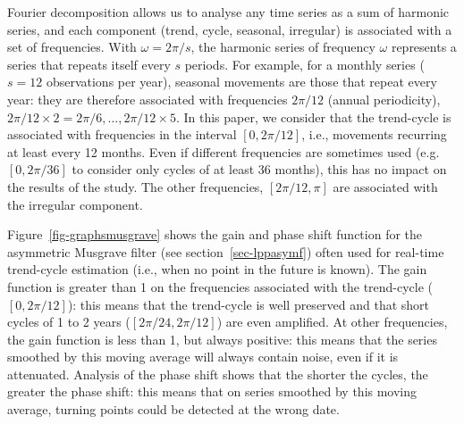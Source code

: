 \documentclass[
]{article}
\newcommand\1{\mathds{1}}
\begin{document}
Fourier decomposition allows us to analyse any time series as a sum of
harmonic series, and each component (trend, cycle, seasonal, irregular)
is associated with a set of frequencies. With \(\omega = 2\pi/s\), the
harmonic series of frequency \(\omega\) represents a series that repeats
itself every \(s\) periods. For example, for a monthly series (\(s=12\)
observations per year), seasonal movements are those that repeat every
year: they are therefore associated with frequencies \(2\pi/12\) (annual
periodicity), \(2\pi/12\times 2=2\pi/6,\dots,2\pi/12\times 5\). In this
paper, we consider that the trend-cycle is associated with frequencies
in the interval \([0, 2\pi/12]\), i.e., movements recurring at least
every 12 months. Even if different frequencies are sometimes used
(e.g.~\([0, 2\pi/36]\) to consider only cycles of at least 36 months),
this has no impact on the results of the study. The other frequencies,
\([2\pi/12, \pi]\) are associated with the irregular component.

Figure~\ref{fig-graphsmusgrave} shows the gain and phase shift function
for the asymmetric Musgrave filter (see section~\ref{sec-lppasymf})
often used for real-time trend-cycle estimation (i.e., when no point in
the future is known). The gain function is greater than 1 on the
frequencies associated with the trend-cycle (\([0, 2\pi/12]\)): this
means that the trend-cycle is well preserved and that short cycles of 1
to 2 years (\([2\pi/24,2\pi/12]\)) are even amplified. At other
frequencies, the gain function is less than 1, but always positive: this
means that the series smoothed by this moving average will always
contain noise, even if it is attenuated. Analysis of the phase shift
shows that the shorter the cycles, the greater the phase shift: this
means that on series smoothed by this moving average, turning points
could be detected at the wrong date.
\end{document}
